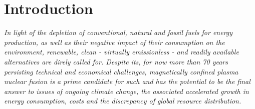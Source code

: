 %
\chapter{Introduction}\label{chap:introduction}%
%
    \textit{%
        In light of the depletion of conventional, natural and fossil fuels for energy production, as well as their negative impact of their consumption on the environment, renewable, clean - virtually emissionless - and readily available alternatives are direly called for. Despite its, for now more than 70 years persisting technical and economical challenges, magnetically confined plasma nuclear fusion is a prime candidate for such and has the potential to be the final answer to issues of ongoing climate change, the associated accelerated growth in energy consumption, costs and the discrepancy of global resource distribution\cite{IPCC2023,Toschi1971}.
    }%
%
